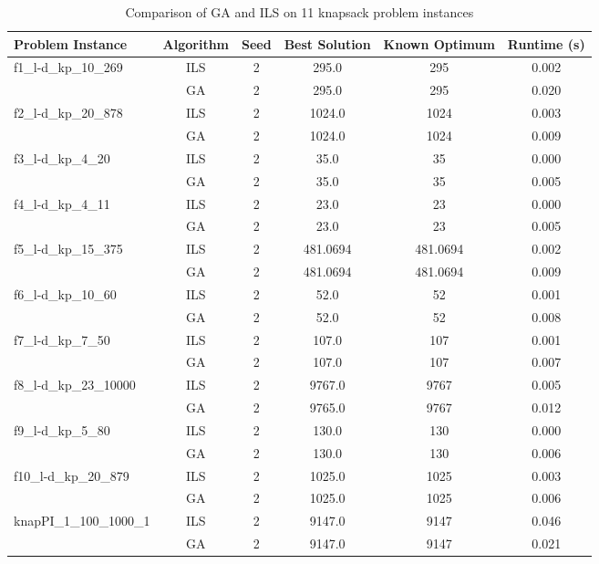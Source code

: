 \documentclass{article}
\begin{document}
\begin{table}[H]
\centering
\caption{Comparison of GA and ILS on 11 knapsack problem instances}
\begin{tabular}{|l|c|c|c|c|c|}
\hline
\textbf{Problem Instance} & \textbf{Algorithm} & \textbf{Seed} & \textbf{Best Solution} & \textbf{Known Optimum} & \textbf{Runtime (s)} \\
\hline
f1\_l-d\_kp\_10\_269 & ILS & 2 & 295.0 & 295 & 0.002 \\
                     & GA  & 2 & 295.0 & 295 & 0.020 \\
\hline
f2\_l-d\_kp\_20\_878 & ILS & 2 & 1024.0 & 1024 & 0.003 \\
                     & GA  & 2 & 1024.0 & 1024 & 0.009 \\
\hline
f3\_l-d\_kp\_4\_20 & ILS & 2 & 35.0 & 35 & 0.000 \\
                   & GA  & 2 & 35.0 & 35 & 0.005 \\
\hline
f4\_l-d\_kp\_4\_11 & ILS & 2 & 23.0 & 23 & 0.000 \\
                                     & GA  & 2 & 23.0 & 23 & 0.005 \\
\hline
f5\_l-d\_kp\_15\_375 & ILS & 2 & 481.0694 & 481.0694 & 0.002 \\
                                         & GA  & 2 & 481.0694 & 481.0694 & 0.009 \\
\hline
f6\_l-d\_kp\_10\_60 & ILS & 2 & 52.0 & 52 & 0.001 \\
                                        & GA  & 2 & 52.0 & 52 & 0.008 \\
\hline
f7\_l-d\_kp\_7\_50 & ILS & 2 & 107.0 & 107 & 0.001 \\
                                     & GA  & 2 & 107.0 & 107 & 0.007 \\
\hline
f8\_l-d\_kp\_23\_10000 & ILS & 2 & 9767.0 & 9767 & 0.005 \\
                       & GA  & 2 & 9765.0 & 9767 & 0.012 \\
\hline
f9\_l-d\_kp\_5\_80 & ILS & 2 & 130.0 & 130 & 0.000 \\
                                     & GA  & 2 & 130.0 & 130 & 0.006 \\
\hline
f10\_l-d\_kp\_20\_879 & ILS & 2 & 1025.0 & 1025 & 0.003 \\
                                            & GA  & 2 & 1025.0 & 1025 & 0.006 \\
\hline
knapPI\_1\_100\_1000\_1 & ILS & 2 & 9147.0 & 9147 & 0.046 \\
                                                & GA  & 2 & 9147.0 & 9147 & 0.021 \\
\hline
\end{tabular}
\end{table}
\end{document}
